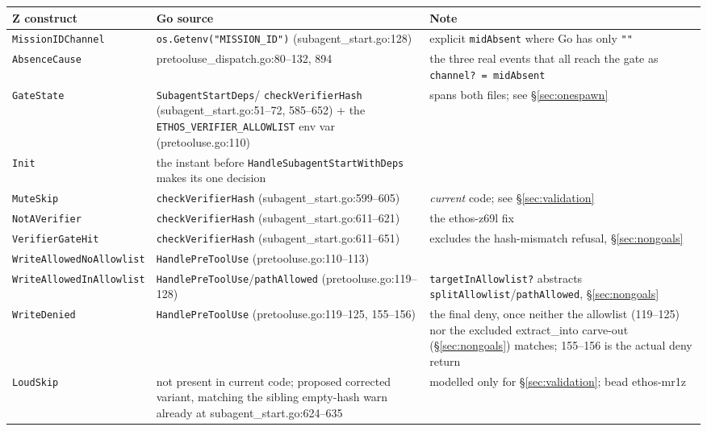 \documentclass[a4paper,10pt,fleqn]{article}
\newcommand{\field}[1]{\texttt{#1}}
\begin{document}
\begin{center}
\begin{tabularx}{\textwidth}{@{}llX@{}}
\toprule
\textbf{Z construct} & \textbf{Go source} & \textbf{Note} \\
\midrule
\field{MissionIDChannel} & \field{os.Getenv("MISSION\_ID")}
  (subagent\_start.go:128) & explicit \field{midAbsent} where Go has
  only \field{""} \\
\field{AbsenceCause} & pretooluse\_dispatch.go:80--132, 894 &
  the three real events that all reach the gate as
  \field{channel? = midAbsent} \\
\field{GateState} & \field{SubagentStartDeps}/
  \field{checkVerifierHash} (subagent\_start.go:51--72, 585--652) $+$
  the \field{ETHOS\_VERIFIER\_ALLOWLIST} env var
  (pretooluse.go:110) & spans both files; see
  \S\ref{sec:onespawn} \\
\field{Init} & the instant before
  \field{HandleSubagentStartWithDeps} makes its one decision & \\
\field{MuteSkip} & \field{checkVerifierHash}
  (subagent\_start.go:599--605) & \emph{current} code; see
  \S\ref{sec:validation} \\
\field{NotAVerifier} & \field{checkVerifierHash}
  (subagent\_start.go:611--621) & the ethos-z69l fix \\
\field{VerifierGateHit} & \field{checkVerifierHash}
  (subagent\_start.go:611--651) & excludes the hash-mismatch refusal,
  \S\ref{sec:nongoals} \\
\field{WriteAllowedNoAllowlist} & \field{HandlePreToolUse}
  (pretooluse.go:110--113) & \\
\field{WriteAllowedInAllowlist} &
  \field{HandlePreToolUse}/\field{pathAllowed}
  (pretooluse.go:119--128) & \field{targetInAllowlist?} abstracts
  \field{splitAllowlist}/\field{pathAllowed}, \S\ref{sec:nongoals} \\
\field{WriteDenied} & \field{HandlePreToolUse}
  (pretooluse.go:119--125, 155--156) & the final deny, once neither
  the allowlist (119--125) nor the excluded extract\_into carve-out
  (\S\ref{sec:nongoals}) matches; 155--156 is the actual deny
  return \\
\field{LoudSkip} & not present in current code; proposed corrected
  variant, matching the sibling empty-hash warn already at
  subagent\_start.go:624--635 & modelled only for
  \S\ref{sec:validation}; bead ethos-mr1z \\
\bottomrule
\end{tabularx}
\end{center}
\end{document}
